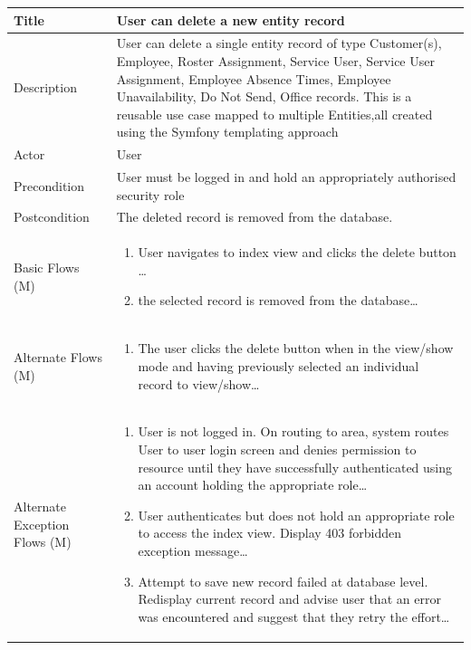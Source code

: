 \documentclass[a4paper,12pt]{article}
\newcommand\addrow[2]{#1 &#2\\ }
\newcommand\addheading[2]{#1 &#2\\ \hline}
\newcommand\tabularhead{\begin{tabular}{lp{11cm}}
\hline
}
\newcommand\addmulrow[2]{ \begin{minipage}[t][][t]{3cm}#1\end{minipage}%
   &\begin{minipage}[t][][t]{11cm}
    \begin{enumerate} #2   \end{enumerate}
    \end{minipage}\\ }
\newenvironment{usecase}{\tabularhead}
{\hline\end{tabular}}
\begin{document}
\begin{samepage}
\begin{usecase}
    \addheading{Title}{User can delete a new entity record }
  \addheading{Description}{User can delete a single entity record of type Customer(s), Employee, Roster Assignment, Service User, Service User Assignment, Employee Absence Times, Employee Unavailability, Do Not Send, Office records. This is a reusable use case mapped to multiple Entities,all created using the Symfony templating approach}
  \addheading{Actor}{User} 
  \addrow{Precondition}{User must be logged in and hold an appropriately authorised security role}
  \addrow{Postcondition}{The deleted record is removed from the database.}
  \addmulrow{Basic Flows (M)}{\item User navigates to index view and clicks the delete button \ldots
  \item the selected record is removed from the database\ldots}
  \addmulrow{Alternate  Flows (M)}{\item The user clicks the delete button when in the view/show mode and having previously selected an individual record to view/show\ldots}
  \addmulrow{Alternate Exception Flows (M)}{\item User is not logged in. On routing to area, system routes User to user login screen and denies permission to resource until they have successfully authenticated using an account holding the appropriate role\ldots
                                                                      \item User authenticates but does not hold an appropriate role to access the index view. Display 403 forbidden exception message\ldots
                                                                      \item Attempt to save new record failed at database level. Redisplay current record and advise user that an error was encountered and suggest that they retry the effort\ldots}

\end{usecase}



\end{samepage}
\end{document}
